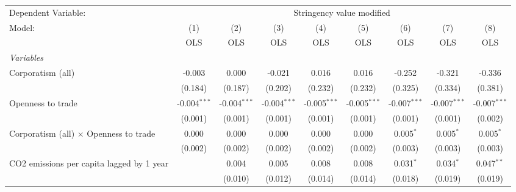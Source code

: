 
\begingroup
\centering
\begin{tabular}{lcccccccc}
   \toprule
   Dependent Variable: & \multicolumn{8}{c}{Stringency value modified}\\
   Model:                                                    & (1)            & (2)            & (3)            & (4)            & (5)            & (6)            & (7)            & (8)\\  
                                                             &  OLS           & OLS            & OLS            & OLS            & OLS            & OLS            & OLS            & OLS\\  
   \midrule
   \emph{Variables}\\
   Corporatism (all)                                         & -0.003         & 0.000          & -0.021         & 0.016          & 0.016          & -0.252         & -0.321         & -0.336\\   
                                                             & (0.184)        & (0.187)        & (0.202)        & (0.232)        & (0.232)        & (0.325)        & (0.334)        & (0.381)\\   
   Openness to trade                                         & -0.004$^{***}$ & -0.004$^{***}$ & -0.004$^{***}$ & -0.005$^{***}$ & -0.005$^{***}$ & -0.007$^{***}$ & -0.007$^{***}$ & -0.007$^{***}$\\   
                                                             & (0.001)        & (0.001)        & (0.001)        & (0.001)        & (0.001)        & (0.001)        & (0.001)        & (0.002)\\   
   Corporatism (all) $\times$ Openness to trade              & 0.000          & 0.000          & 0.000          & 0.000          & 0.000          & 0.005$^{*}$    & 0.005$^{*}$    & 0.005$^{*}$\\   
                                                             & (0.002)        & (0.002)        & (0.002)        & (0.002)        & (0.002)        & (0.003)        & (0.003)        & (0.003)\\   
   CO2 emissions per capita lagged by 1 year                 &                & 0.004          & 0.005          & 0.008          & 0.008          & 0.031$^{*}$    & 0.034$^{*}$    & 0.047$^{**}$\\   
                                                             &                & (0.010)        & (0.012)        & (0.014)        & (0.014)        & (0.018)        & (0.019)        & (0.019)\\   

\end{tabular}
